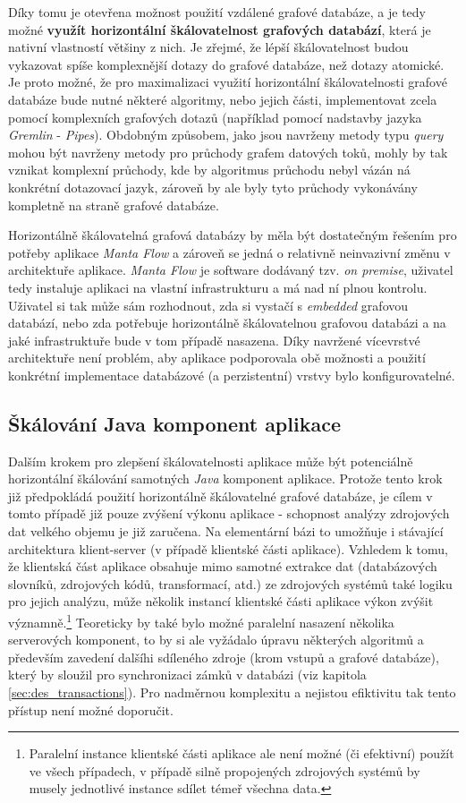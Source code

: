 Díky tomu je otevřena možnost použití vzdálené grafové databáze, a je tedy možné \textbf{využít horizontální škálovatelnost grafových databází}, která je nativní vlastností většiny z nich. Je zřejmé, že lépší škálovatelnost budou vykazovat spíše komplexnější dotazy do grafové databáze, než dotazy atomické. Je proto možné, že pro maximalizaci využití horizontální škálovatelnosti grafové databáze bude nutné některé algoritmy, nebo jejich části, implementovat zcela pomocí komplexních grafových dotazů (například pomocí nadstavby jazyka \textit{Gremlin} - \textit{Pipes}). Obdobným způsobem, jako jsou navrženy metody typu \textit{query} mohou být navrženy metody pro průchody grafem datových toků, mohly by tak vznikat komplexní průchody, kde by algoritmus průchodu nebyl vázán ná konkrétní dotazovací jazyk, zároveň by ale byly tyto průchody vykonávány kompletně na straně grafové databáze.

Horizontálně škálovatelná grafová databázy by měla být dostatečným řešením pro potřeby aplikace \textit{Manta Flow} a zároveň se jedná o relativně neinvazivní změnu v architektuře aplikace. \textit{Manta Flow} je software dodávaný tzv. \textit{on premise}, uživatel tedy instaluje aplikaci na vlastní infrastrukturu a má nad ní plnou kontrolu. Uživatel si tak může sám rozhodnout, zda si vystačí s \textit{embedded} grafovou databází, nebo zda potřebuje horizontálně škálovatelnou grafovou databázi a na jaké infrastruktuře bude v tom případě nasazena. Díky navržené vícevrstvé architektuře není problém, aby aplikace podporovala obě možnosti a použití konkrétní implementace databázové (a perzistentní) vrstvy bylo konfigurovatelné.


\subsection{Škálování Java komponent aplikace}
\label{sec:des_scaling_java}
Dalším krokem pro zlepšení škálovatelnosti aplikace může být potenciálně horizontální škálování samotných \textit{Java} komponent aplikace. Protože tento krok již předpokládá použití horizontálně škálovatelné grafové databáze, je cílem v tomto případě již pouze zvýšení výkonu aplikace - schopnost analýzy zdrojových dat velkého objemu je již zaručena. Na elementární bázi to umožňuje i stávající architektura klient-server (v případě klientské části aplikace). Vzhledem k tomu, že klientská část aplikace obsahuje mimo samotné extrakce dat (databázových slovníků, zdrojových kódů, transformací, atd.) ze zdrojových systémů také logiku pro jejich analýzu, může několik instancí klientské části aplikace výkon zvýšit významně.\footnote{Paralelní instance klientské části aplikace ale není možné (či efektivní) použít ve všech případech, v případě silně propojených zdrojových systémů by musely jednotlivé instance sdílet témeř všechna data.} Teoreticky by také bylo možné paralelní nasazení několika serverových komponent, to by si ale vyžádalo úpravu některých algoritmů a především zavedení dalšíhi sdíleného zdroje (krom vstupů a grafové databáze), který by sloužil pro synchronizaci zámků v databázi (viz kapitola \ref{sec:des_transactions}). Pro nadměrnou komplexitu a nejistou efiktivitu tak tento přístup není možné doporučit.

